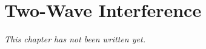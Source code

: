 \chapter{Two-Wave Interference}\label{ch:b2:two-wave-interference}


\emph{This chapter has not been written yet.}
